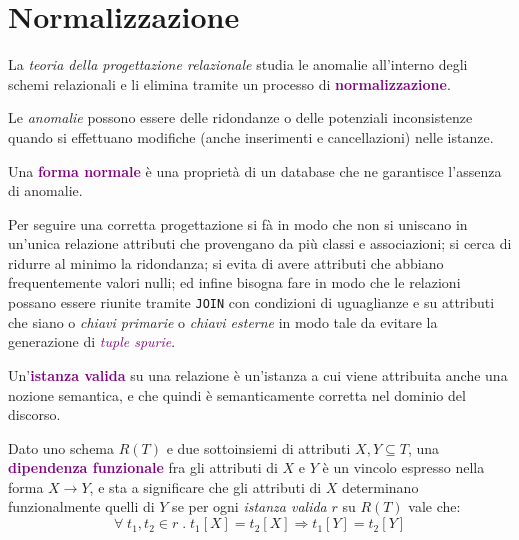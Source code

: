 \newpage

\section{Normalizzazione}

La \emph{teoria della progettazione relazionale} studia le anomalie all'interno
degli schemi relazionali e li elimina tramite un processo di \textbf{\textcolor{purple}{normalizzazione}}.

Le \emph{anomalie} possono essere delle ridondanze o delle potenziali
inconsistenze quando si effettuano modifiche (anche inserimenti e cancellazioni) nelle istanze.

\begin{definition}
    Una \textbf{\textcolor{purple}{forma normale}} è una proprietà di un
    database che ne garantisce l'assenza di anomalie.
\end{definition}

Per seguire una corretta progettazione si fà in modo che non si uniscano in un'unica
relazione attributi che provengano da più classi e associazioni; si cerca di ridurre
al minimo la ridondanza; si evita di avere attributi che abbiano frequentemente
valori nulli; ed infine bisogna fare in modo che le relazioni possano essere riunite
tramite \verb|JOIN| con condizioni di uguaglianze e su attributi che siano o \emph{chiavi primarie}
o \emph{chiavi esterne} in modo tale da evitare la generazione di \emph{\textcolor{purple}{tuple spurie}}.

\begin{definition}
    Un'\textbf{\textcolor{purple}{istanza valida}} su una relazione è un'istanza a cui
    viene attribuita anche una nozione semantica, e che quindi è semanticamente corretta
    nel dominio del discorso.
\end{definition}

\begin{definition}
    Dato uno schema $R(T)$ e due sottoinsiemi di attributi $X, Y \subseteq T$, una \textbf{\textcolor{purple}{dipendenza funzionale}}
    fra gli attributi di $X$ e $Y$ è un vincolo espresso nella forma $X \rightarrow Y$, e sta a significare
    che gli attributi di $X$ determinano funzionalmente quelli di $Y$ se per ogni \emph{istanza valida} $r$ su $R(T)$ vale che:
    \begin{equation*}
        \forall \; t_1, t_2 \in r\;.\;t_1[X] = t_2[X] \Rightarrow t_1[Y] = t_2[Y]
    \end{equation*}
\end{definition}

